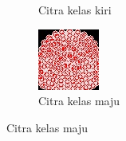 \begin{figure}[H]
\begin{subfigure}{0.3\textwidth}
      \caption{Citra kelas kiri}
      \label{fig:image2}
  \end{subfigure}
  \hfill
  \begin{subfigure}{0.3\textwidth}
      \centering
      \includegraphics[width=\linewidth]{gambar/100 maju.jpg}
      \caption{Citra kelas maju}
      \label{fig:image3}
  \end{subfigure}
  

\end{figure}
